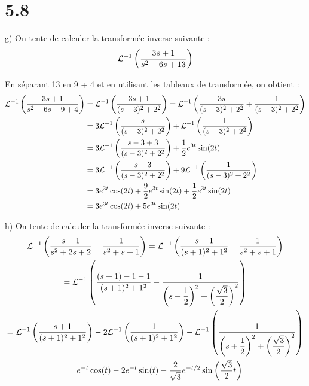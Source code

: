 \section*{5.8}

g) On tente de calculer la transformée inverse suivante :
\begin{align*}
    \mathcal{L}^{-1}\left({\dfrac{3s+1}{s^2-6s+13}}\right)
\end{align*}

En séparant 13 en 9 + 4 et en utilisant les tableaux de transformée,
on obtient :
\begin{align*}
    \mathcal{L}^{-1}\left({\dfrac{3s+1}{s^2-6s+9+4}}\right) &=
    \mathcal{L}^{-1}\left({\dfrac{3s+1}{(s-3)^2+2^2}}\right) =
    \mathcal{L}^{-1}\left({\dfrac{3s}{(s-3)^2+2^2} +\dfrac{1}{(s-3)^2+2^2}}\right) \\
    &= 3\mathcal{L}^{-1}\left({\dfrac{s}{(s-3)^2+2^2}}\right) +\mathcal{L}^{-1}\left({\dfrac{1}{(s-3)^2+2^2}}\right) \\
    &= 3\mathcal{L}^{-1}\left({\dfrac{s-3+3}{(s-3)^2+2^2}}\right) +\dfrac{1}{2}e^{3t}\sin(2t) \\
    &= 3\mathcal{L}^{-1}\left({\dfrac{s-3}{(s-3)^2+2^2}}\right) + 9\mathcal{L}^{-1}\left({\dfrac{1}{(s-3)^2+2^2}}\right) \\
    &= 3 e^{3t}\cos(2t) +\dfrac{9}{2}e^{3t}\sin(2t) +\dfrac{1}{2}e^{3t}\sin(2t) \\
    &= 3 e^{3t}\cos(2t) +5e^{3t}\sin(2t)
\end{align*}

h) On tente de calculer la transformée inverse suivante :
\begin{gather*}
    \mathcal{L}^{-1}\left({\dfrac{s-1}{s^2+2s+2}-\dfrac{1}{s^2+s+1}}\right) =
    \mathcal{L}^{-1}\left({\dfrac{s-1}{(s+1)^2 + 1^2} -\dfrac{1}{s^2+s+1}}\right) \\
    = \mathcal{L}^{-1}\left({\dfrac{(s+1)-1-1}{(s+1)^2 + 1^2}
    -\dfrac{1}{\left({s+\dfrac{1}{2}}\right)^2+\left({\dfrac{\sqrt{3}}{2}}\right)^2}}\right) \\
    = \mathcal{L}^{-1}\left({\dfrac{s+1}{(s+1)^2 + 1^2}}\right) -2\mathcal{L}^{-1}\left({\dfrac{1}{(s+1)^2 + 1^2}}\right)
    -\mathcal{L}^{-1}\left({\dfrac{1}{\left({s+\dfrac{1}{2}}\right)^2+\left({\dfrac{\sqrt{3}}{2}}\right)^2}}\right) \\
    = e^{-t}\cos(t) -2 e^{-t}\sin(t)
    -\dfrac{2}{\sqrt{3}}e^{-t/2}\sin\left({\dfrac{\sqrt{3}}{2}t}\right)
\end{gather*}
